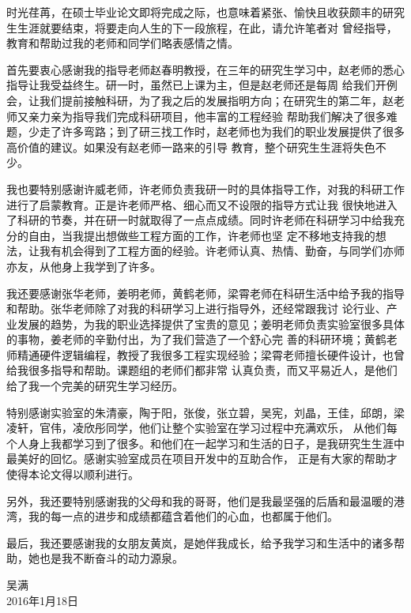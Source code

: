 
\begin{Acknowledgement}
时光荏苒，在硕士毕业论文即将完成之际，也意味着紧张、愉快且收获颇丰的研究生生涯就要结束，将要走向人生的下一段旅程，在此，请允许笔者对
曾经指导，教育和帮助过我的老师和同学们略表感情之情。

首先要衷心感谢我的指导老师赵春明教授，在三年的研究生学习中，赵老师的悉心指导让我受益终生。研一时，虽然已上课为主，但是赵老师还是每周
给我们开例会，让我们提前接触科研，为了我之后的发展指明方向；在研究生的第二年，赵老师又亲力亲为指导我们完成科研项目，他丰富的工程经验
帮助我们解决了很多难题，少走了许多弯路；到了研三找工作时，赵老师也为我们的职业发展提供了很多高价值的建议。如果没有赵老师一路来的引导
教育，整个研究生生涯将失色不少。

我也要特别感谢许威老师，许老师负责我研一时的具体指导工作，对我的科研工作进行了启蒙教育。正是许老师严格、细心而又不设限的指导方式让我
很快地进入了科研的节奏，并在研一时就取得了一点点成绩。同时许老师在科研学习中给我充分的自由，当我提出想做些工程方面的工作，许老师也坚
定不移地支持我的想法，让我有机会得到了工程方面的经验。许老师认真、热情、勤奋，与同学们亦师亦友，从他身上我学到了许多。

我还要感谢张华老师，姜明老师，黄鹤老师，梁霄老师在科研生活中给予我的指导和帮助。张华老师除了对我的科研学习上进行指导外，还经常跟我讨
论行业、产业发展的趋势，为我的职业选择提供了宝贵的意见；姜明老师负责实验室很多具体的事物，姜老师的辛勤付出，为了我们营造了一个舒心完
善的科研环境；黄鹤老师精通硬件逻辑编程，教授了我很多工程实现经验；梁霄老师擅长硬件设计，也曾给我很多指导和帮助。课题组的老师们都非常
认真负责，而又平易近人，是他们给了我一个完美的研究生学习经历。

特别感谢实验室的朱清豪，陶于阳，张俊，张立碧，吴宪，刘晶，王佳，邱朗，梁凌轩，官伟，凌欣彤同学，他们让整个实验室在学习过程中充满欢乐，
从他们每个人身上我都学习到了很多。和他们在一起学习和生活的日子，是我研究生生涯中最美好的回忆。感谢实验室成员在项目开发中的互助合作，
正是有大家的帮助才使得本论文得以顺利进行。

另外，我还要特别感谢我的父母和我的哥哥，他们是我最坚强的后盾和最温暖的港湾，我的每一点的进步和成绩都蕴含着他们的心血，也都属于他们。

最后，我还要感谢我的女朋友黄岚，是她伴我成长，给予我学习和生活中的诸多帮助，她也是我不断奋斗的动力源泉。
\begin{flushright}
吴满\\
2016年1月18日\\
\end{flushright}

\end{Acknowledgement}
